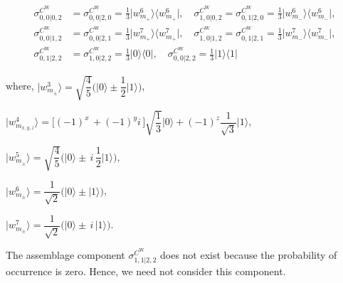 \documentclass[reprint,superscriptaddress,nofootinbib,amsmath,amssymb,aps,pra,longbibliography]{revtex4-1}
\newcommand{\blu}{\color{blue}}
\begin{document}
\begin{widetext}
\begin{align}
     \sigma_{0,0|0,2}^{C^{\text{W}}} &= \sigma_{0,0|2,0}^{C^{\text{W}}} = \frac{1}{3} \Big| w_{m_{+}}^6 \Big\rangle \Big\langle w_{m_{+}}^6 \Big| , \quad \sigma_{1,0|0,2}^{C^{\text{W}}} = \sigma_{0,1|2,0}^{C^{\text{W}}} = \frac{1}{3} \Big| w_{m_{-}}^6 \Big\rangle \Big\langle w_{m_{-}}^6 \Big| , \nonumber \\
     \sigma_{0,0|1,2}^{C^{\text{W}}} &= \sigma_{0,0|2,1}^{C^{\text{W}}} = \frac{1}{3} \Big| w_{m_{+}}^7 \Big\rangle \Big\langle w_{m_{+}}^7 \Big| , \quad \sigma_{1,0|1,2}^{C^{\text{W}}} = \sigma_{0,1|2,1}^{C^{\text{W}}} = \frac{1}{3} \Big| w_{m_{-}}^7 \Big\rangle \Big\langle w_{m_{-}}^7 \Big| , \nonumber \\
      \sigma_{0,1|2,2}^{C^{\text{W}}} &= \sigma_{1,0|2,2}^{C^{\text{W}}} =  \frac{1}{3} \Big| 0 \Big\rangle \Big\langle 0 \Big| , \quad  \sigma_{0,0|2,2}^{C^{\text{W}}} = \frac{1}{3} \Big| 1 \Big\rangle \Big\langle 1 \Big| 
	\label{W2SA}
\end{align}

where, $ \Big| w_{m_{\pm}}^{3} \Bigg\rangle   = \sqrt{\dfrac{4}{5}} \Bigg(  \Big| 0 \Big\rangle \pm \dfrac{1}{2} \Big| 1 \Big\rangle \Bigg)$,

$\Big|w_{m_{x,y,z}}^4\Big\rangle = \Big[ (-1)^x  \, + (-1)^y i\, \Big] \sqrt{\dfrac{1}{3}} \Big|0\Big\rangle + (-1)^z \dfrac{1}{\sqrt{3}} \Big|1\Big\rangle$, 

$\Big|w_{m_{\pm}}^5\Big\rangle = \sqrt{\dfrac{4}{5}} \Bigg(  \Big| 0 \Big\rangle \pm \, i \, \dfrac{1}{2} \Big| 1 \Big\rangle \Bigg)$,

$ \Big| w_{m_{\pm}}^{6} \Big\rangle  = \dfrac{1}{\sqrt{2}} \Big(  \Big| 0 \Big\rangle \pm  \Big| 1 \Big\rangle \Big)$,

$ \Big| w_{m_{\pm}}^{7} \Big\rangle  = \dfrac{1}{\sqrt{2}} \Big(  \Big| 0 \Big\rangle \pm \, i \,  \Big| 1 \Big\rangle \Big)$.

The assemblage component $\sigma_{1,1|2,2}^{C^{\text{W}}}$ does not exist because the probability of occurrence is zero. Hence, we need not consider this component.







\end{widetext}
\end{document}

